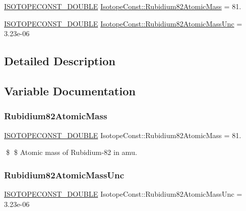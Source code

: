 \begin{DoxyCompactItemize}
\item 
\mbox{\hyperlink{group___isotope_const-_macros_ga8f45a7272ce02c0b4c65c44636ed719a}{I\+S\+O\+T\+O\+P\+E\+C\+O\+N\+S\+T\+\_\+\+D\+O\+U\+B\+LE}} \mbox{\hyperlink{group___isotope_const-_rubidium-_rb82_gaff2e3d1be3e5de052fd265ce8b41fb3e}{Isotope\+Const\+::\+Rubidium82\+Atomic\+Mass}} = 81.
\item 
\mbox{\hyperlink{group___isotope_const-_macros_ga8f45a7272ce02c0b4c65c44636ed719a}{I\+S\+O\+T\+O\+P\+E\+C\+O\+N\+S\+T\+\_\+\+D\+O\+U\+B\+LE}} \mbox{\hyperlink{group___isotope_const-_rubidium-_rb82_ga9ae1bc1f20d7d7f05a49bba502135dd6}{Isotope\+Const\+::\+Rubidium82\+Atomic\+Mass\+Unc}} = 3.\+23e-\/06
\end{DoxyCompactItemize}


\subsection{Detailed Description}


\subsection{Variable Documentation}
\mbox{\label{group___isotope_const-_rubidium-_rb82_gaff2e3d1be3e5de052fd265ce8b41fb3e}} 
\subsubsection{\texorpdfstring{Rubidium82\+Atomic\+Mass}{Rubidium82AtomicMass}}
{\footnotesize\ttfamily \mbox{\hyperlink{group___isotope_const-_macros_ga8f45a7272ce02c0b4c65c44636ed719a}{I\+S\+O\+T\+O\+P\+E\+C\+O\+N\+S\+T\+\_\+\+D\+O\+U\+B\+LE}} Isotope\+Const\+::\+Rubidium82\+Atomic\+Mass = 81.}

\$ \$ Atomic mass of Rubidium-\/82 in amu. \mbox{\label{group___isotope_const-_rubidium-_rb82_ga9ae1bc1f20d7d7f05a49bba502135dd6}} 
\subsubsection{\texorpdfstring{Rubidium82\+Atomic\+Mass\+Unc}{Rubidium82AtomicMassUnc}}
{\footnotesize\ttfamily \mbox{\hyperlink{group___isotope_const-_macros_ga8f45a7272ce02c0b4c65c44636ed719a}{I\+S\+O\+T\+O\+P\+E\+C\+O\+N\+S\+T\+\_\+\+D\+O\+U\+B\+LE}} Isotope\+Const\+::\+Rubidium82\+Atomic\+Mass\+Unc = 3.\+23e-\/06}

